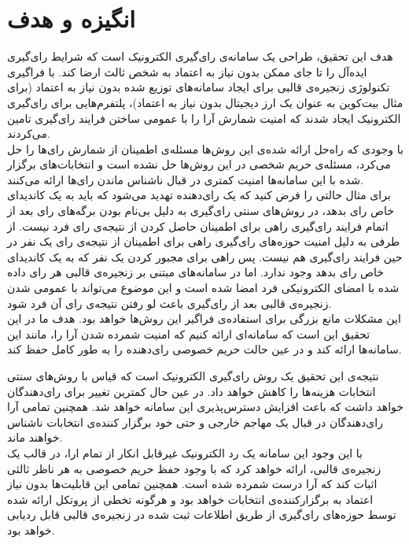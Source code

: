 \section{انگیزه و هدف}
هدف این تحقیق، طراحی یک سامانه‌ی رای‌گیری الکترونیک است که شرایط رای‌گیری ایده‌آل را تا جای ممکن بدون نیاز به اعتماد به شخص ثالث ارضا کند. با فراگیری تکنولوژی زنجیره‌ی قالبی برای ایجاد سامانه‌های توزیع شده بدون نیاز به اعتماد (برای مثال بیت‌کوین به عنوان یک‌ ارز دیجیتال بدون نیاز به اعتماد)، پلتفرم‌هایی برای رای‌گیری الکترونیک ایجاد شدند که امنیت شمارش آرا را با عمومی ساختن فرایند رای‌گیری تامین می‌کردند. 
\\
با وجودی که راه‌حل ارائه شده‌ی این روش‌ها مسئله‌ی اطمینان از شمارش رای‌ها را حل می‌کرد، مسئله‌ی حریم شخصی در این روش‌ها حل نشده است و انتخابات‌های برگزار شده با این سامانه‌ها امنیت کمتری در قبال ناشناس ماندن رای‌ها ارائه می‌کنند. 
\\
برای مثال حالتی را فرض کنید که یک رای‌دهنده تهدید می‌شود که باید به یک کاندیدای خاص رای بدهد، در روش‌های سنتی رای‌گیری به دلیل بی‌نام بودن برگه‌های رای بعد از اتمام فرایند رای‌گیری راهی برای اطمینان حاصل کردن از نتیجه‌ی رای فرد نیست. از طرفی به دلیل امنیت حوزه‌های رای‌گیری راهی برای اطمینان از نتیجه‌ی رای یک نفر در حین فرایند رای‌گیری هم نیست. پس راهی برای مجبور کردن یک نفر که به یک کاندیدای خاص رای بدهد وجود ندارد. اما در سامانه‌های مبتنی بر زنجیره‌ی قالبی هر رای داده شده با امضای الکترونیکی فرد امضا شده است و این موضوع می‌تواند با عمومی شدن زنجیره‌ی قالبی بعد از رای‌گیری باعث لو رفتن نتیجه‌ی رای آن فرد شود.
\\
این مشکلات مانع بزرگی برای استفاده‌ی فراگیر این روش‌ها خواهد بود. هدف ما در این تحقیق این است که سامانه‌ای ارائه کنیم که امنیت شمرده شدن آرا را، مانند این سامانه‌ها ارائه کند و در عین حالت حریم خصوصی رای‌دهنده را به طور کامل حفظ کند. 
\par
نتیجه‌ی این تحقیق یک روش‌ رای‌گیری الکترونیک است که قیاس با روش‌های سنتی انتخابات هزینه‌ها را کاهش خواهد داد. در عین حال کمترین تغییر برای رای‌دهندگان خواهد داشت که باعث افزایش دسترس‌پذیری این سامانه خواهد شد. همچنین تمامی آرا رای‌دهندگان در قبال یک مهاجم خارجی و حتی خود برگزار کننده‌ی انتخابات ناشناس خواهند ماند. 
\\
با این وجود این سامانه یک رد الکترونیک غیرقابل انکار از تمام ارا، در قالب یک زنجیره‌ی قالبی، ارائه ‌خواهد کرد که با وجود حفظ حریم خصوصی به هر ناظر ثالثی اثبات کند که آرا درست شمرده شده است. همچنین تمامی این قابلیت‌ها بدون نیاز اعتماد به برگزارکننده‌ی انتخابات خواهد بود و هرگونه تخطی از پروتکل ارائه شده توسط حوزه‌های رای‌گیری از طریق اطلاعات ثبت شده در زنجیره‌ی قالبی قابل ردیابی خواهد بود.








